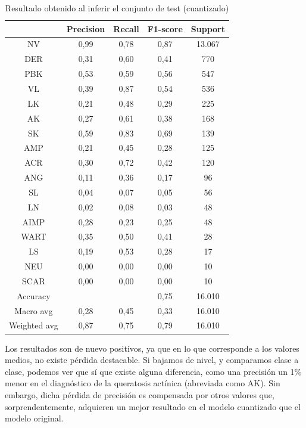 \begin{table}[H]
	\centering
	\begin{tabular}{|c|c|c|c|c|}
		\hline
		~ & Precision & Recall & F1-score & Support \\ \hline
		NV & 0,99 & 0,78 & 0,87 & 13.067 \\ \hline
		DER & 0,31 & 0,60 & 0,41 & 770 \\ \hline
		PBK & 0,53 & 0,59 & 0,56 & 547 \\ \hline
		VL & 0,39 & 0,87 & 0,54 & 536 \\ \hline
		LK & 0,21 & 0,48 & 0,29 & 225 \\ \hline
		AK & 0,27 & 0,61 & 0,38 & 168 \\ \hline
		SK & 0,59 & 0,83 & 0,69 & 139 \\ \hline
		AMP & 0,21 & 0,45 & 0,28 & 125 \\ \hline
		ACR & 0,30 & 0,72 & 0,42 & 120 \\ \hline
		ANG & 0,11 & 0,36 & 0,17 & 96 \\ \hline
		SL & 0,04 & 0,07 & 0,05 & 56 \\ \hline
		LN & 0,02 & 0,08 & 0,03 & 48 \\ \hline
		AIMP & 0,28 & 0,23 & 0,25 & 48 \\ \hline
		WART & 0,35 & 0,50 & 0,41 & 28 \\ \hline
		LS & 0,19 & 0,53 & 0,28 & 17 \\ \hline
		NEU & 0,00 & 0,00 & 0,00 & 10 \\ \hline
		SCAR & 0,00 & 0,00 & 0,00 & 10 \\ \hline
		Accuracy & ~ & ~ & 0,75 & 16.010 \\ \hline
		Macro avg & 0,28 & 0,45 & 0,33 & 16.010 \\ \hline
		Weighted avg & 0,87 & 0,75 & 0,79 & 16.010 \\ \hline
	\end{tabular}
	\caption{Resultado obtenido al inferir el conjunto de test (cuantizado)}
	\label{tab:testbenquant}
\end{table}

Los resultados son de nuevo positivos, ya que en lo que corresponde a los valores medios, no existe pérdida destacable. Si bajamos de nivel, y comparamos clase a clase, podemos ver que sí que existe alguna diferencia, como  una precisión un 1\% menor en el diagnóstico de la queratosis actínica (abreviada como AK). Sin embargo, dicha pérdida de precisión es compensada por otros valores que, sorprendentemente, adquieren un mejor resultado en el modelo cuantizado que el modelo original.

